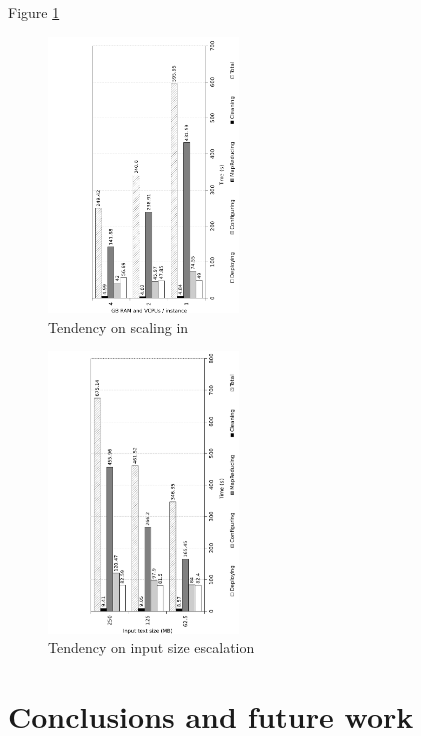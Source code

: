 \documentclass{sig-alternate}
\begin{document}
Figure \ref{fig:scalein}

\begin{figure}[tp]
\centering
\includegraphics[width=0.45\textwidth]{img/008}
\caption{Tendency on scaling in}
\label{fig:scalein}
\end{figure}

\begin{figure}[tp]
\centering
\includegraphics[width=0.45\textwidth]{img/009}
\caption{Tendency on input size escalation}
\label{fig:inputscale}
\end{figure}

\section{Conclusions and future work}\label{sec:conclusions}
\noindent

\nocite{*}



\end{document}
